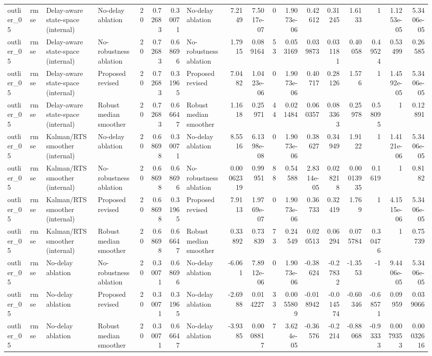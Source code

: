 \begin{table}[!htbp]
{\begin{tabular}{llllrrrlrrrrrrrrrr}
outlier_05 & rmse & Delay-aware state-space (internal) & No-delay ablation & 20 & 0.72683 & 0.30071 & No-delay ablation & 7.2149 & 7.5017e-07 & 0 & 1.9073e-06 & 0.42612 & 0.31245 & 1.6133 & 1 & 1.1253e-05 & 5.3406e-05 \\
outlier_05 & rmse & Delay-aware state-space (internal) & No-robustness ablation & 20 & 0.72683 & 0.68696 & No-robustness ablation & 1.7915 & 0.089164 & 53 & 0.053169 & 0.039873 & 0.031181 & 0.40058 & 0.49524 & 0.53499 & 0.26585 \\
outlier_05 & rmse & Delay-aware state-space (internal) & Proposed revised & 20 & 0.72683 & 0.31965 & Proposed revised & 7.0482 & 1.0423e-06 & 0 & 1.9073e-06 & 0.40717 & 0.28126 & 1.576 & 1 & 1.4592e-05 & 5.3406e-05 \\
outlier_05 & rmse & Delay-aware state-space (internal) & Robust median smoother & 20 & 0.72683 & 0.66647 & Robust median smoother & 1.1618 & 0.25971 & 44 & 0.021484 & 0.060357 & 0.083363 & 0.25978 & 0.58095 & 1 & 0.12891 \\
outlier_05 & rmse & Kalman/RTS smoother (internal) & No-delay ablation & 20 & 0.68698 & 0.30071 & No-delay ablation & 8.5516 & 6.1398e-08 & 0 & 1.9073e-06 & 0.38627 & 0.34949 & 1.9122 & 1 & 1.4121e-06 & 5.3406e-05 \\
outlier_05 & rmse & Kalman/RTS smoother (internal) & No-robustness ablation & 20 & 0.68698 & 0.68696 & No-robustness ablation & 0.00062319 & 0.99951 & 88 & 0.54588 & 2.8314e-05 & 0.028218 & 0.00013935 & 0.1619 & 1 & 0.8182 \\
outlier_05 & rmse & Kalman/RTS smoother (internal) & Proposed revised & 20 & 0.68698 & 0.31965 & Proposed revised & 7.9113 & 1.9769e-07 & 0 & 1.9073e-06 & 0.36733 & 0.32419 & 1.769 & 1 & 4.1515e-06 & 5.3406e-05 \\
outlier_05 & rmse & Kalman/RTS smoother (internal) & Robust median smoother & 20 & 0.68698 & 0.66647 & Robust median smoother & 0.33892 & 0.73839 & 73 & 0.24549 & 0.020513 & 0.06294 & 0.075784 & 0.30476 & 1 & 0.75739 \\
outlier_05 & rmse & No-delay ablation & No-robustness ablation & 20 & 0.30071 & 0.68696 & No-delay ablation & -6.061 & 7.8912e-06 & 0 & 1.9073e-06 & -0.38624 & -0.27832 & -1.3553 & -1 & 9.4406e-05 & 5.3406e-05 \\
outlier_05 & rmse & No-delay ablation & Proposed revised & 20 & 0.30071 & 0.31965 & No-delay ablation & -2.6988 & 0.014227 & 33 & 0.0055809 & -0.018942 & -0.014574 & -0.60346 & -0.68571 & 0.09959 & 0.039066 \\
outlier_05 & rmse & No-delay ablation & Robust median smoother & 20 & 0.30071 & 0.66647 & No-delay ablation & -3.9385 & 0.0008817 & 7 & 3.624e-05 & -0.36576 & -0.2214 & -0.88068 & -0.93333 & 0.0079353 & 0.00032616 \\

\end{tabular}}
\end{table}
